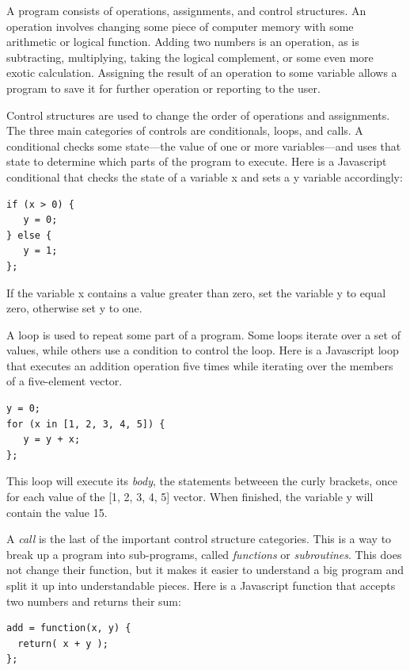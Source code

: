 \documentclass[11pt]{article}
\begin{document}
A program consists of operations, assignments, and control
structures.  An operation involves changing some piece of computer
memory with some arithmetic or logical function.  Adding two numbers
is an operation, as is subtracting, multiplying, taking the logical
complement, or some even more exotic calculation.  Assigning the
result of an operation to some variable allows a program to save it
for further operation or reporting to the user.

Control structures are used to change the order of operations and
assignments.  The three main categories of controls are conditionals,
loops, and calls.  A conditional checks some state---the value of one
or more variables---and uses that state to determine which parts of
the program to execute.  Here is a Javascript conditional that checks
the state of a variable x and sets a y variable accordingly:

\begin{verbatim}
if (x > 0) {
   y = 0;
} else {
   y = 1;
};
\end{verbatim}

If the variable x contains a value greater than zero, set the variable
y to equal zero, otherwise set y to one.

A loop is used to repeat some part of a program.  Some loops iterate
over a set of values, while others use a condition to control the
loop.  Here is a Javascript loop that executes an addition operation
five times while iterating over the members of a five-element vector.

\begin{verbatim}
y = 0;
for (x in [1, 2, 3, 4, 5]) {
   y = y + x;
};
\end{verbatim}

This loop will execute its \emph{body}, the statements betweeen the
curly brackets, once for each value of the [1, 2, 3, 4, 5] vector.
When finished, the variable y will contain the value 15.

A \emph{call} is the last of the important control structure
categories.  This is a way to break up a program into sub-programs,
called \emph{functions} or \emph{subroutines}.  This does not change
their function, but it makes it easier to understand a big program and
split it up into understandable pieces.  Here is a Javascript function
that accepts two numbers and returns their sum:

\begin{verbatim}
add = function(x, y) {
  return( x + y );
};
\end{verbatim}
\end{document}
